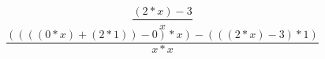 \documentclass[12pt]{article}
\begin{document}
  $$\frac{(2 * x) - 3}{x}$$
  $$\frac{((((0 * x) + (2 * 1)) - 0) * x) - (((2 * x) - 3) * 1)}{x * x}$$
\end{document}
